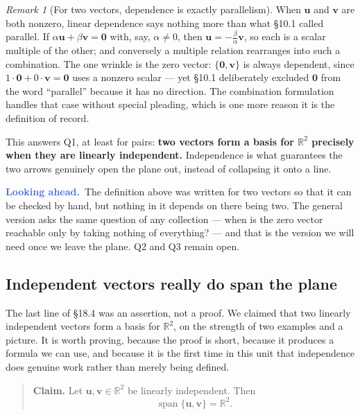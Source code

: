 \documentclass[11pt]{article}
\theoremstyle{definition}
\theoremstyle{remark}
\newtheorem*{rmk}{Remark}
\newcommand{\lookahead}{\par\smallskip\noindent
  \textbf{\sffamily\textcolor{RoyalBlue}{Looking ahead.}}\ \ignorespaces}
\newcommand{\R}{\mathbb{R}}
\newcommand{\vc}[1]{\mathbf{#1}}
\DeclareMathOperator{\spanop}{span}   %
\begin{document}
\begin{rmk}[For two vectors, dependence is exactly parallelism]
When $\vc{u}$ and $\vc{v}$ are both nonzero, linear dependence says nothing more
than what \S10.1 called parallel. If $\alpha\vc{u}+\beta\vc{v}=\vc{0}$ with, say,
$\alpha\neq0$, then $\vc{u}=-\tfrac{\beta}{\alpha}\vc{v}$, so each is a scalar
multiple of the other; and conversely a multiple relation rearranges into such a
combination. The one wrinkle is the zero vector: $\{\vc{0},\vc{v}\}$ is always
dependent, since $1\cdot\vc{0}+0\cdot\vc{v}=\vc{0}$ uses a nonzero scalar --- yet
\S10.1 deliberately excluded $\vc{0}$ from the word ``parallel'' because it has
no direction. The combination formulation handles that case without special
pleading, which is one more reason it is the definition of record.
\end{rmk}

\noindent This answers Q1, at least for pairs: \textbf{two vectors form a basis
for $\R^{2}$ precisely when they are linearly independent.} Independence is what
guarantees the two arrows genuinely open the plane out, instead of collapsing it
onto a line.

\lookahead The definition above was written for two vectors so that it can be
checked by hand, but nothing in it depends on there being two. The general
version asks the same question of any collection --- when is the zero vector
reachable only by taking nothing of everything? --- and that is the version we
will need once we leave the plane. Q2 and Q3 remain open.

\subsection{Independent vectors really do span the plane}
The last line of \S18.4 was an assertion, not a proof. We claimed that two
linearly independent vectors form a basis for $\R^{2}$, on the strength of two
examples and a picture. It is worth proving, because the proof is short, because
it produces a formula we can use, and because it is the first time in this unit
that independence does genuine work rather than merely being defined.

\begin{quote}
\textbf{Claim.} Let $\vc{u},\vc{v}\in\R^{2}$ be linearly independent. Then
\[
  \spanop\{\vc{u},\vc{v}\} = \R^{2} .
\]
\end{quote}
\end{document}
